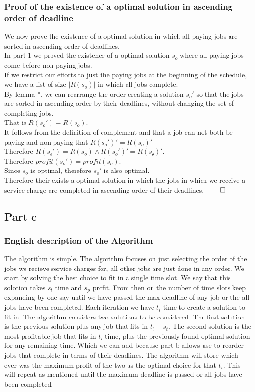 \documentclass{article}
\begin{document}
      \subsubsection{Proof of the existence of a optimal solution in ascending order of deadline}
        We now prove the existence of a optimal solution in which all paying jobs are sorted in ascending order of deadlines. \\
        In part 1 we proved the existence of a optimal solution $s_{o}$ where all paying jobs come before non-paying jobs. \\
        If we restrict our efforts to just the paying jobs at the beginning of the schedule, we have a list of size $|R(s_{o})|$ in which all jobs complete. \\
        By lemma *, we can rearrange the order creating a solution $s_{o}'$ so that the jobs are sorted in ascending order by their deadlines, without changing the set of completing jobs. \\
        That is $R(s_{o}') = R(s_{o})$. \\
        It follows from the definition of complement and that a job can not both be paying and non-paying that $R(s_{o}')' = R(s_{o})'$. \\
        Therefore $R(s_{o}') = R(s_{o}) \land R(s_{o}')' = R(s_{o})'$. \\
        Therefore $profit(s_{o}') = profit(s_{o})$.\\
        Since $s_{o}$ is optimal, therefore $s_{o}'$ is also optimal. \\
        Therefore their exists a optimal solution in which the jobs in which we receive a service charge are completed in ascending order of their deadlines. $\qed$
    \subsection{Part c}
      \subsubsection{English description of the Algorithm}
        The algorithm is simple. 
        The algorithm focuses on just selecting the order of the jobs we recieve service charges for, all other jobs are just done in any order. 
        We start by solving the best choice to fit in a single time slot.
        We say that this solotion takes $s_{t}$ time and $s_{p}$ profit.
        From then on the number of time slots keep expanding by one say until we have passed the max deadline of any job or the all jobs have been completed.
        Each iteration we have $t_{i}$ time to create a solution to fit in.
        The algorithm considers two solutions to be considered.
        The first solution is the previous solution plus any job that fits in $t_{i} - s_{t}$.
        The second solution is the most profitable job that fits in $t_{i}$ time, plus the previously found optimal solution for any remaining time.
        Which we can add because part b allows use to reorder jobs that complete in terms of their deadlines.
        The algorithm will store which ever was the maximum profit of the two as the optimal choice for that $t_{i}$. This will repeat as mentioned until the maximum deadline is passed or all jobs have been completed.
\end{document}
